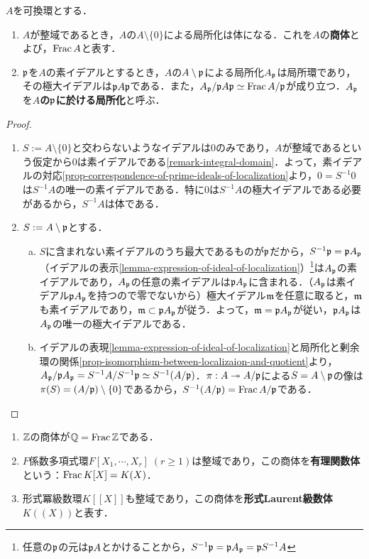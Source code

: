 \documentclass[uplatex,dvipdfmx]{jsreport}
\begin{document}
\begin{definition}
    $A$を可換環とする．
    \begin{enumerate}
        \item $A$が整域であるとき，$A$の$A\setminus\{0\}$による局所化は体になる．これを$A$の\textbf{商体}とよび，$\mathrm{Frac}\, A$と表す．
        \item $\mathfrak{p}$を$A$の素イデアルとするとき，$A$の$A\setminus\mathfrak{p}$による局所化$A_{\mathfrak{p}}$は局所環であり，その極大イデアルは$\mathfrak{p} A\mathfrak{p}$である．また，$A_{\mathfrak{p}}/\mathfrak{p} A\mathfrak{p}\simeq\mathrm{Frac}\, A/\mathfrak{p}$が成り立つ．$A_{\mathfrak{p}}$を\textbf{$A$の$\mathfrak{p}$に於ける局所化}と呼ぶ．
    \end{enumerate}
\end{definition}
\begin{proof}\mbox{}
    \begin{enumerate}
        \item $S:=A\setminus\{0\}$と交わらないようなイデアルは$0$のみであり，$A$が整域であるという仮定から$0$は素イデアルである\ref{remark-integral-domain}．よって，素イデアルの対応\ref{prop-correspondence-of-prime-ideals-of-localization}より，$0=S^{-1}0$は$S^{-1}A$の唯一の素イデアルである．特に$0$は$S^{-1}A$の極大イデアルである必要があるから，$S^{-1}A$は体である．
        \item $S:=A\setminus\mathfrak{p}$とする．
        \begin{enumerate}[(a)]
            \item $S$に含まれない素イデアルのうち最大であるものが$\mathfrak{p}$だから，$S^{-1}\mathfrak{p}=\mathfrak{p} A_{\mathfrak{p}}$（イデアルの表示\ref{lemma-expression-of-ideal-of-localization}）\footnote{任意の$\mathfrak{p}$の元は$\mathfrak{p} A$とかけることから，$S^{-1}\mathfrak{p}=\mathfrak{p} A_{\mathfrak{p}}=\mathfrak{p} S^{-1}A$}は$A_{\mathfrak{p}}$の素イデアルであり，$A_{\mathfrak{p}}$の任意の素イデアルは$\mathfrak{p} A_{\mathfrak{p}}$に含まれる．（$A_{\mathfrak{p}}$は素イデアル$\mathfrak{p} A_{\mathfrak{p}}$を持つので零でないから）極大イデアル$\mathfrak{m}$を任意に取ると，$\mathfrak{m}$も素イデアルであり，$\mathfrak{m}\subset\mathfrak{p} A_{\mathfrak{p}}$が従う．よって，$\mathfrak{m}=\mathfrak{p} A_{\mathfrak{p}}$が従い，$\mathfrak{p} A_{\mathfrak{p}}$は$A_{\mathfrak{p}}$の唯一の極大イデアルである．
            \item イデアルの表現\ref{lemma-expression-of-ideal-of-localization}と局所化と剰余環の関係\ref{prop-isomorphism-between-localizaion-and-quotient}より，
            $A_{\mathfrak{p}}/\mathfrak{p} A_{\mathfrak{p}}=S^{-1}A/S^{-1}\mathfrak{p}\simeq S^{-1}(A/\mathfrak{p})$．$\pi:A\twoheadrightarrow A/\mathfrak{p}$による$S=A\setminus\mathfrak{p}$の像は$\pi(S)=(A/\mathfrak{p})\setminus\{0\}$であるから，$S^{-1}(A/\mathfrak{p})=\mathrm{Frac}\, A/\mathfrak{p}$である．
        \end{enumerate}
    \end{enumerate}
\end{proof}
\begin{example}[商体の例]\label{exp-field-of-quotients}\mbox{}
    \begin{enumerate}
        \item $\mathbb{Z}$の商体が$\mathbb{Q}=\mathrm{Frac}\,\mathbb{Z}$である．
        \item $F$係数多項式環$F[X_1,\cdots,X_r]\;(r\ge 1)$は整域であり，この商体を\textbf{有理関数体}という：$\mathrm{Frac}\, K[X]=K(X)$．
        \item 形式冪級数環$K[[X]]$も整域であり，この商体を\textbf{形式Laurent級数体}$K((X))$と表す．
    \end{enumerate}
\end{example}
\end{document}
